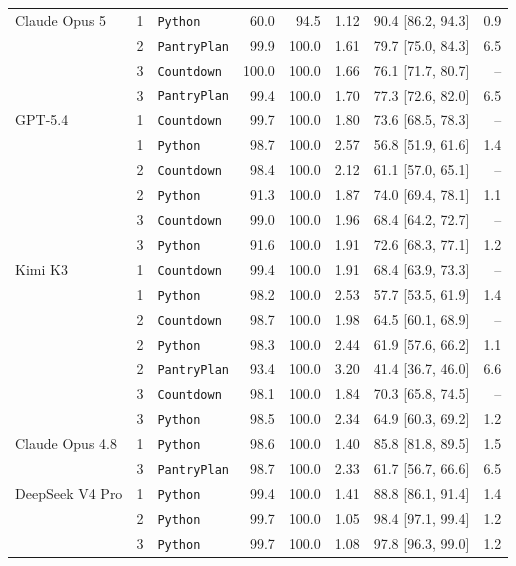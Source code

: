 \begin{longtable}{@{}lrlrrrrr@{}}
    \addlinespace[2pt]
    Claude Opus 5 & 1 & \texttt{Python} & 60.0 & 94.5 & 1.12 & 90.4 [86.2, 94.3] & 0.9 \\
     & 2 & \texttt{PantryPlan} & 99.9 & 100.0 & 1.61 & 79.7 [75.0, 84.3] & 6.5 \\
     & 3 & \texttt{Countdown} & 100.0 & 100.0 & 1.66 & 76.1 [71.7, 80.7] & -- \\
     & 3 & \texttt{PantryPlan} & 99.4 & 100.0 & 1.70 & 77.3 [72.6, 82.0] & 6.5 \\
    \addlinespace[2pt]
    GPT-5.4 & 1 & \texttt{Countdown} & 99.7 & 100.0 & 1.80 & 73.6 [68.5, 78.3] & -- \\
     & 1 & \texttt{Python} & 98.7 & 100.0 & 2.57 & 56.8 [51.9, 61.6] & 1.4 \\
     & 2 & \texttt{Countdown} & 98.4 & 100.0 & 2.12 & 61.1 [57.0, 65.1] & -- \\
     & 2 & \texttt{Python} & 91.3 & 100.0 & 1.87 & 74.0 [69.4, 78.1] & 1.1 \\
     & 3 & \texttt{Countdown} & 99.0 & 100.0 & 1.96 & 68.4 [64.2, 72.7] & -- \\
     & 3 & \texttt{Python} & 91.6 & 100.0 & 1.91 & 72.6 [68.3, 77.1] & 1.2 \\
    \addlinespace[2pt]
    Kimi K3 & 1 & \texttt{Countdown} & 99.4 & 100.0 & 1.91 & 68.4 [63.9, 73.3] & -- \\
     & 1 & \texttt{Python} & 98.2 & 100.0 & 2.53 & 57.7 [53.5, 61.9] & 1.4 \\
     & 2 & \texttt{Countdown} & 98.7 & 100.0 & 1.98 & 64.5 [60.1, 68.9] & -- \\
     & 2 & \texttt{Python} & 98.3 & 100.0 & 2.44 & 61.9 [57.6, 66.2] & 1.1 \\
     & 2 & \texttt{PantryPlan} & 93.4 & 100.0 & 3.20 & 41.4 [36.7, 46.0] & 6.6 \\
     & 3 & \texttt{Countdown} & 98.1 & 100.0 & 1.84 & 70.3 [65.8, 74.5] & -- \\
     & 3 & \texttt{Python} & 98.5 & 100.0 & 2.34 & 64.9 [60.3, 69.2] & 1.2 \\
    \addlinespace[2pt]
    Claude Opus 4.8 & 1 & \texttt{Python} & 98.6 & 100.0 & 1.40 & 85.8 [81.8, 89.5] & 1.5 \\
     & 3 & \texttt{PantryPlan} & 98.7 & 100.0 & 2.33 & 61.7 [56.7, 66.6] & 6.5 \\
    \addlinespace[2pt]
    DeepSeek V4 Pro & 1 & \texttt{Python} & 99.4 & 100.0 & 1.41 & 88.8 [86.1, 91.4] & 1.4 \\
     & 2 & \texttt{Python} & 99.7 & 100.0 & 1.05 & 98.4 [97.1, 99.4] & 1.2 \\
     & 3 & \texttt{Python} & 99.7 & 100.0 & 1.08 & 97.8 [96.3, 99.0] & 1.2 \\
\end{longtable}
\endgroup
